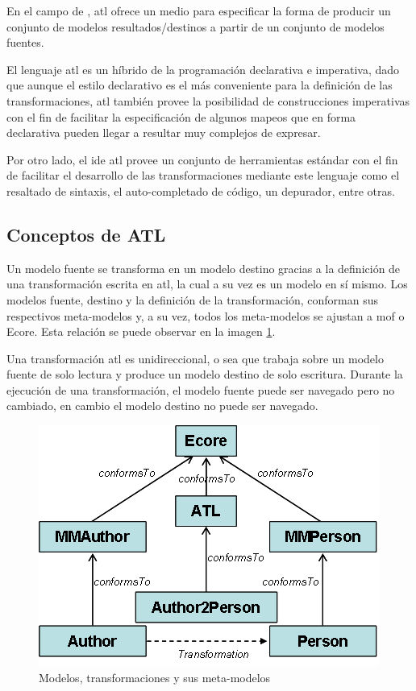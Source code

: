 \documentclass[a4paper,12pt,oneside,spanish]{book}
\begin{document}
En el campo de , \gls{atl} ofrece un medio para especificar la forma de producir un conjunto de modelos resultados/destinos a partir de un conjunto de modelos fuentes.

El lenguaje \gls{atl} es un híbrido de la programación declarativa e imperativa, dado que aunque el estilo declarativo es el más conveniente para la definición de las transformaciones, \gls{atl} también provee la posibilidad de construcciones imperativas con el fin de facilitar la especificación de algunos mapeos que en forma declarativa pueden llegar a resultar muy complejos de expresar.

Por otro lado, el \gls{ide} \gls{atl} provee un conjunto de herramientas estándar con el fin de facilitar el desarrollo de las transformaciones mediante este lenguaje como el  resaltado de sintaxis, el auto-completado de código, un depurador, entre otras.



\subsection{Conceptos de ATL}

Un modelo fuente se transforma en un modelo destino gracias a la definición de una transformación escrita en \gls{atl}, la cual a su vez es un modelo en sí mismo. Los modelos fuente, destino y la definición de la transformación, conforman sus respectivos meta-modelos y, a su vez, todos los meta-modelos se ajustan a \gls{mof} o \textsf{Ecore}. Esta relación se puede observar en la imagen \ref{fig:ATL-concepts}.

Una transformación \gls{atl} es unidireccional, o sea que trabaja sobre un modelo fuente de solo lectura y produce un modelo destino de solo escritura. Durante la ejecución de una transformación, el modelo fuente puede ser navegado pero no cambiado, en cambio el modelo destino no puede ser navegado.

\begin{figure}[hbtp]
\centering
\includegraphics[scale=.65]{./img/ATL-concepts}
\caption{Modelos, transformaciones y sus meta-modelos}
\label{fig:ATL-concepts}
\end{figure}
\end{document}
